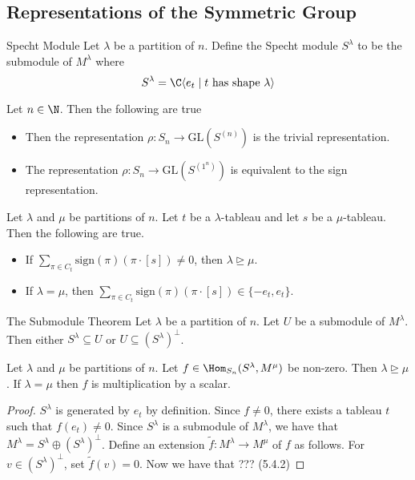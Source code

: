 \documentclass[a4paper]{article}
\begin{document}
\subsection{Representations of the Symmetric Group}
\begin{defn}{Specht Module}{} Let $\lambda$ be a partition of $n$. Define the Specht module $S^\lambda$ to be the submodule of $M^\lambda$ where $$S^\lambda=\C\langle e_t\;|\;t\text{ has shape }\lambda\rangle$$
\end{defn}

\begin{lmm}{}{} Let $n\in\N$. Then the following are true 
\begin{itemize}
\item Then the representation $\rho:S_n\to\text{GL}(S^{(n)})$ is the trivial representation. 
\item The representation $\rho:S_n\to\text{GL}(S^{(1^n)})$ is equivalent to the sign representation. 
\end{itemize}
\end{lmm}

\begin{lmm}{}{} Let $\lambda$ and $\mu$ be partitions of $n$. Let $t$ be a $\lambda$-tableau and let $s$ be a $\mu$-tableau. Then the following are true. 
\begin{itemize}
\item If $\sum_{\pi\in C_t}\text{sign}(\pi)(\pi\cdot[s])\neq 0$, then $\lambda\trianglerighteq\mu$. 
\item If $\lambda=\mu$, then $\sum_{\pi\in C_t}\text{sign}(\pi)(\pi\cdot[s])\in\{-e_t,e_t\}$. 
\end{itemize}
\end{lmm}

\begin{thm}{The Submodule Theorem}{} Let $\lambda$ be a partition of $n$. Let $U$ be a submodule of $M^\lambda$. Then either $S^\lambda\subseteq U$ or $U\subseteq(S^\lambda)^\perp$. 
\end{thm}

\begin{lmm}{}{} Let $\lambda$ and $\mu$ be partitions of $n$. Let $f\in\Hom_{S_n}(S^\lambda,M^\mu)$ be non-zero. Then $\lambda\trianglerighteq\mu$. If $\lambda=\mu$ then $f$ is multiplication by a scalar. \tcbline
\begin{proof}
$S^\lambda$ is generated by $e_t$ by definition. Since $f\neq 0$, there exists a tableau $t$ such that $f(e_t)\neq 0$. Since $S^\lambda$ is a submodule of $M^\lambda$, we have that $M^\lambda=S^\lambda\oplus(S^\lambda)^\perp$. Define an extension $\tilde{f}:M^\lambda\to M^\mu$ of $f$ as follows. For $v\in(S^\lambda)^\perp$, set $\tilde{f}(v)=0$. Now we have that ??? (5.4.2)
\end{proof}
\end{lmm}
\end{document}
